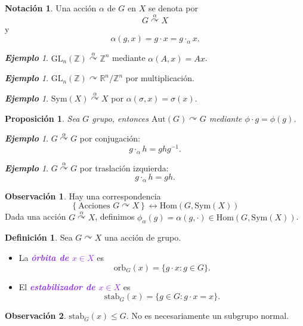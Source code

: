 \documentclass{article}
\newtheorem{proposition}[theorem]{Proposición}
\theoremstyle{definition}
\newtheorem{definition}[theorem]{Definición}
\newtheorem*{notation}{Notación}
\newtheorem*{obs}{Observación}
\theoremstyle{remark}
\newtheorem{example}[theorem]{\textbf{Ejemplo}}
\numberwithin{equation}{section}
\newcommand{\R}{\mathbb{R}}
\newcommand{\Z}{\mathbb{Z}}
\newcommand{\acts}{\curvearrowright}
\newcommand{\actsby}[1]{\stackrel{#1}{\acts}}
\renewcommand{\c}{\cdot}
\newcommand{\orb}{\mathrm{orb}}
\newcommand{\GL}{\mathrm{GL}}
\newcommand{\Sym}{\mathrm{Sym}}
\newcommand{\Aut}{\mathrm{Aut}}
\newcommand{\Hom}{\mathrm{Hom}}
\newcommand{\stab}{\mathrm{stab}}
\newcommand{\set}[1]{\left\{ #1 \right\}}
\newcommand{\wea}[1]{\textcolor{BlueViolet}{\textbf{\emph{#1}}}}
\begin{document}
\begin{notation}
  Una acción $\alpha$ de $G$ en $X$ se denota por $$G \actsby{\alpha} X$$ y $$\alpha(g,x) = g \c x = g \c_\alpha x.$$
\end{notation}

\begin{example}
  $\GL_n(\Z) \actsby\alpha \Z^n$ mediante $\alpha(A,x) = Ax$.
\end{example}

\begin{example}
  $\GL_n(\Z) \acts \R^n/\Z^n$ por multiplicación.
\end{example}

\begin{example}
  $\Sym(X) \actsby\alpha X$ por $\alpha(\sigma,x) = \sigma(x)$.
\end{example}

\begin{proposition}
  Sea $G$ grupo, entonces $\Aut(G) \acts G$ mediante $\phi \c g = \phi(g)$.
\end{proposition}

\begin{example}
  $G \actsby\alpha G$ por conjugación: $$g \c_\alpha h = ghg^{-1}.$$
\end{example}

\begin{example}
  $G \actsby\alpha G$ por traslación izquierda: $$g \c_\alpha h = gh.$$
\end{example}

\begin{obs}
  Hay una correspondencia
  \[
  \set{\text{Acciones $G \acts X$}} \leftrightarrow \Hom(G,\Sym(X))
  \]
  Dada una acción $G \actsby\alpha X$, definimos $\phi_\alpha(g) = \alpha(g,\c) \in \Hom(G,\Sym(X))$.
\end{obs}

\begin{definition}
  Sea $G \acts X$ una acción de grupo.
  \begin{itemize}
    \item La \wea{órbita de $x \in X$} es $$\orb_G(x) = \{g \c x : g \in G\}.$$
    \item El \wea{estabilizador de $x \in X$} es $$\stab_G(x) = \{g \in G : g \c x = x\}.$$
  \end{itemize}
\end{definition}

\begin{obs}
  $\stab_G(x) \leqslant G$. No es necesariamente un subgrupo normal. %
\end{obs}
\end{document}
